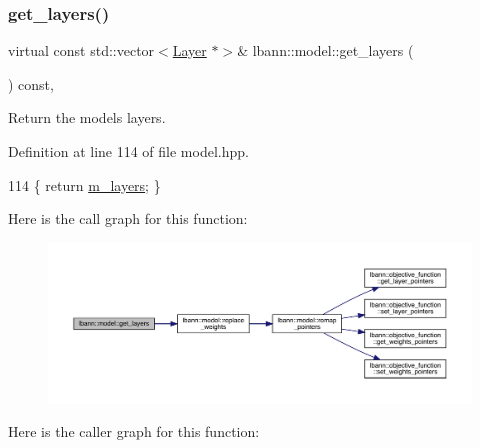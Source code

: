 \subsubsection{\texorpdfstring{get\+\_\+layers()}{get\_layers()}}
{\footnotesize\ttfamily virtual const std\+::vector$<$\hyperlink{classlbann_1_1Layer}{Layer} $\ast$$>$\& lbann\+::model\+::get\+\_\+layers (\begin{DoxyParamCaption}{ }\end{DoxyParamCaption}) const\hspace{0.3cm}{\ttfamily [inline]}, {\ttfamily [virtual]}}

Return the model\textquotesingle{}s layers. 

Definition at line 114 of file model.\+hpp.


\begin{DoxyCode}
114 \{ \textcolor{keywordflow}{return} \hyperlink{classlbann_1_1model_a0229fc226ec163d1411548446104569d}{m\_layers}; \}
\end{DoxyCode}
Here is the call graph for this function\+:\nopagebreak
\begin{figure}[H]
\begin{center}
\leavevmode
\includegraphics[width=350pt]{classlbann_1_1model_ae14f4b2cc8882b3739d4aeb25d9e73c9_cgraph}
\end{center}
\end{figure}
Here is the caller graph for this function\+:\nopagebreak
